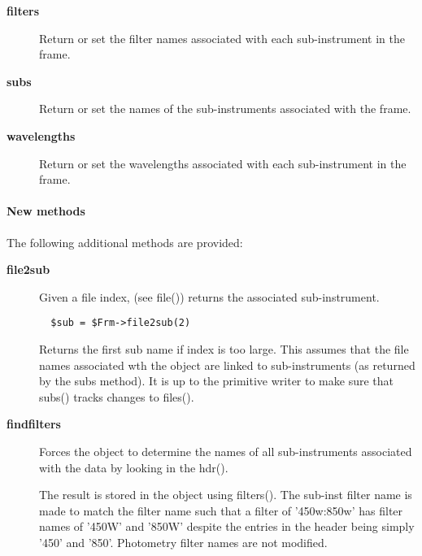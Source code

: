 \begin{description}
\begin{description}
\begin{description}

\item[{\textbf{filters}}] \mbox{}

Return or set the filter names associated with each sub-instrument
in the frame.


\item[{\textbf{subs}}] \mbox{}

Return or set the names of the sub-instruments associated
with the frame.


\item[{\textbf{wavelengths}}] \mbox{}

Return or set the wavelengths associated with each  sub-instrument
in the frame.

\end{description}
\paragraph*{New methods\label{ORAC::Frame::SCUBA_New_methods}}


The following additional methods are provided:

\begin{description}

\item[{\textbf{file2sub}}] \mbox{}

Given a file index, (see file()) returns the associated
sub-instrument.

\begin{verbatim}
  $sub = $Frm->file2sub(2)
\end{verbatim}


Returns the first sub name if index is too large.
This assumes that the file names associated wth the
object are linked to sub-instruments (as returned
by the subs method). It is up to the primitive writer
to make sure that subs() tracks changes to files().


\item[{\textbf{findfilters}}] \mbox{}

Forces the object to determine the names of all sub-instruments
associated with the data by looking in the hdr().



The result is stored in the object using filters(). The sub-inst filter
name is made to match the filter name such that a filter of '450w:850w'
has filter names of '450W' and '850W' despite the entries in the header
being simply '450' and '850'. Photometry filter names are not modified.




\end{description}
\end{description}
\end{description}
